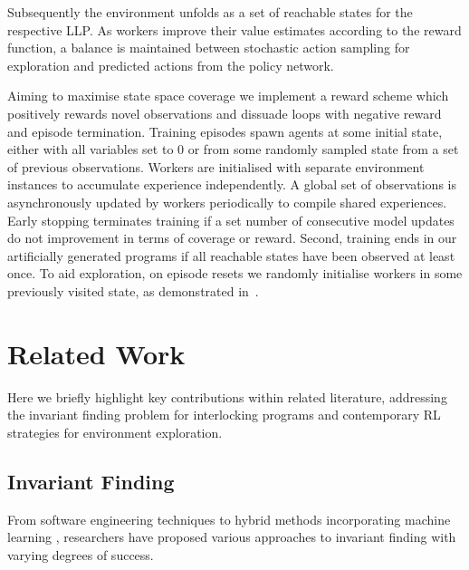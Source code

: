 \documentclass[conference,compsoc]{IEEEtran}
\begin{document}

Subsequently the environment unfolds as a set of reachable states for the respective LLP. As workers improve their value estimates according to the reward function, a balance is maintained between stochastic action sampling for exploration and predicted actions from the policy network.

Aiming to maximise state space coverage we implement a reward scheme which positively rewards novel observations and dissuade loops with negative reward and episode termination. Training episodes spawn agents at some initial state, either with all variables set to 0 or from some randomly sampled state from a set of previous observations. Workers are initialised with separate environment instances to accumulate experience independently. A global set of observations is asynchronously updated by workers periodically to compile shared experiences. Early stopping terminates training if a set number of consecutive model updates do not improvement in terms of coverage or reward. Second, training ends in our artificially generated programs if all reachable states have been observed at least once. To aid exploration, on episode resets we randomly initialise workers in some previously visited state, as demonstrated in~\cite{gordillo2021improving}. 

\section{Related Work}
Here we briefly highlight key contributions within related literature, addressing the invariant finding problem for interlocking programs and contemporary RL strategies for environment exploration.

\subsection{Invariant Finding}
From software engineering techniques \cite{case2007automated, bensalem1996powerful} to hybrid methods incorporating machine learning \cite{garg2016learning}, researchers have proposed various approaches to invariant finding with varying degrees of success.
\end{document}
